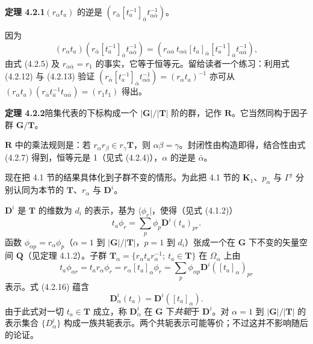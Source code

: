 \noindent\textbf{定理 4.2.1}\quad $(r_{\alpha}t_{a})$ 的逆是 $\left(r_{\bar{\alpha}}[t^{-1}_{a}]_{\bar{\alpha}}t^{-1}_{\alpha\bar{\alpha}}\right)$。

因为
\begin{equation*}
(r_{\alpha}t_{a})(r_{\bar{\alpha}}[t^{-1}_{a}]_{\bar{\alpha}}t^{-1}_{\alpha\bar{\alpha}}) = \left(r_{\alpha\bar{\alpha}}\, t_{\alpha\bar{\alpha}}[t_{a}]_{\bar{\alpha}}[t^{-1}_{a}]_{\bar{\alpha}}t^{-1}_{\alpha\bar{\alpha}}\right),
\end{equation*}
由式 (4.2.5) 及 $r_{\alpha\bar{\alpha}} = r_{1}$ 的事实，它等于恒等元。留给读者一个练习：利用式 (4.2.12) 与 (4.2.13) 验证 $\left(r_{\bar{\alpha}}[t^{-1}_{a}]_{\bar{\alpha}}t^{-1}_{\alpha\bar{\alpha}}\right) = (r_{\alpha}t_{a})^{-1}$ 亦可从 $(r_{\alpha}t_{a})(r_{\bar{\alpha}}t^{-1}_{a}t_{\alpha\bar{\alpha}}) = (r_{1}t_{1})$ 得出。

\noindent\textbf{定理 4.2.2}\quad 陪集代表的下标构成一个 $|\mathbf{G}|/|\mathbf{T}|$ 阶的群，记作 $\mathbf{R}$。它当然同构于因子群 $\mathbf{G}/\mathbf{T}$。

$\mathbf{R}$ 中的乘法规则是：若 $r_{\alpha}r_{\beta} \in r_{\gamma}\mathbf{T}$，则 $\alpha\beta = \gamma$。封闭性由构造即得，结合性由式 (4.2.7) 得到，恒等元是 1（见式 (4.2.4)），$\alpha$ 的逆是 $\bar{\alpha}$。

现在把 4.1 节的结果具体化到子群不变的情形。为此把 4.1 节的 $\mathbf{K}_{1}$、$p_{\alpha}$ 与 $\Gamma^{j}$ 分别认同为本节的 $\mathbf{T}$、$r_{\alpha}$ 与 $\mathbf{D}^{i}$。

$\mathbf{D}^{i}$ 是 $\mathbf{T}$ 的维数为 $d_{i}$ 的表示，基为 $\langle \phi_{r} |$，使得（见式 (4.1.2)）
\begin{equation*}
t_{a}\phi_{r} = \sum_{p}\phi_{p}\mathbf{D}^{i}(t_{a})_{pr}.
\tag{4.2.15}
\end{equation*}
函数 $\phi_{\alpha p} = r_{\alpha}\phi_{p}$（$\alpha = 1$ 到 $|\mathbf{G}|/|\mathbf{T}|$，$p = 1$ 到 $d_{i}$）张成一个在 $\mathbf{G}$ 下不变的矢量空间 $\mathbf{Q}$（见定理 4.1.2）。子群 $\mathbf{T}_{\alpha} = \{r_{\alpha}t_{a}r^{-1}_{\alpha};\ t_{a} \in \mathbf{T}\}$ 在 $\Omega_{\alpha}$ 上由
\begin{equation*}
t_{a}\phi_{\alpha r} = t_{a}r_{\alpha}\phi_{r} = r_{\alpha}[t_{a}]_{\alpha}\phi_{r} = \sum_{p}\phi_{\alpha p}\mathbf{D}^{i}([t_{a}]_{\alpha})_{pr}
\tag{4.2.16}
\end{equation*}
表示。式 (4.2.16) 蕴含
\begin{equation*}
\mathbf{D}^{i}_{\alpha}(t_{a}) = \mathbf{D}^{i}([t_{a}]_{\alpha}).
\tag{4.2.17}
\end{equation*}
由于此式对一切 $t_{a} \in \mathbf{T}$ 成立，称 $\mathbf{D}^{i}_{\alpha}$ 在 $\mathbf{G}$ 下\textit{共轭}于 $\mathbf{D}^{i}$。对 $\alpha = 1$ 到 $|\mathbf{G}|/|\mathbf{T}|$ 的表示集合 $\{D^{i}_{\alpha}\}$ 构成一族共轭表示。两个共轭表示可能等价；不过这并不影响随后的论证。

